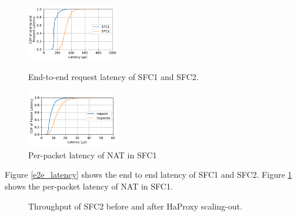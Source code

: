 \begin{figure}
  \begin{minipage}[t]{0.47\columnwidth}
    \centering
    \includegraphics[width=4.0cm]{fig/e2e_latency_chain12.pdf}

    \caption{\small{End-to-end request latency of SFC1 and SFC2.}}
    \label{e2e_latency}
  \end{minipage}%
  \hfill
  \hfill
  \begin{minipage}[t]{0.47\columnwidth}
    \centering
    \includegraphics[width=4.0cm]{fig/cdf_chain1.pdf}
    \caption{\small{Per-packet latency of NAT in SFC1}}
    \label{nat_latency}
  \end{minipage}

\end{figure}

Figure \ref{e2e_latency} shows the end to end latency of SFC1 and SFC2.
Figure \ref{nat_latency} shows the per-packet latency of NAT in SFC1.


\begin{figure}[!t]
\centering
{}
\hfil
{}
\hfil
\caption{Throughput of SFC2 before and after HaProxy scaling-out.}
\label{throughput}
\end{figure}


